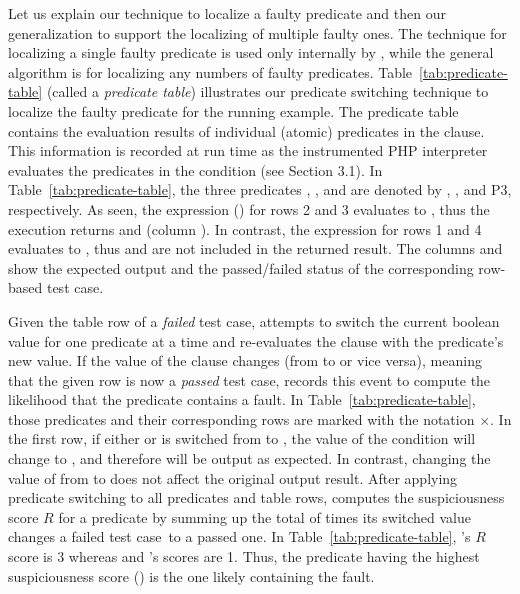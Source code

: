 Let us explain our technique to localize a faulty predicate and
then our generalization to support the localizing of multiple faulty
ones.  The technique for localizing a single faulty predicate is used
only internally by {\tool}, while the general algorithm is for localizing
any numbers of faulty predicates. Table~\ref{tab:predicate-table}
(called a \emph{predicate table}) illustrates our predicate switching
technique to localize the faulty predicate for the running example.
The predicate table contains the evaluation results of individual
(atomic) predicates in the  clause. This information is
recorded at run time as the instrumented PHP interpreter evaluates the
predicates in the
 condition (see Section 3.1). In
Table~\ref{tab:predicate-table}, the three predicates , , and  are denoted
by , , and {P3}, respectively. As seen, the
 expression () for rows 2 and 3
evaluates to , thus the execution returns
 and  (column ). In contrast,
the  expression for rows 1 and 4 evaluates to
, thus  and  are not included in
the returned result. The columns  and
 show the expected output and the passed/failed
status of the corresponding row-based test case.


Given the table row of a \emph{failed} test case, \tool{} attempts to
switch the current boolean value for one predicate at a time and
re-evaluates the  clause with the predicate's new
value. If the value of the  clause changes (from
 to  or vice versa), meaning that the given row
is now a \emph{passed} test case, \tool{} records this event to
compute the likelihood that the predicate contains a fault. In
Table~\ref{tab:predicate-table}, those predicates and their
corresponding rows are marked with the notation $\times$. In the first
row, if either  or  is switched from  to
, the value of the
 condition  will change to
, and therefore  will be output as expected. 
In contrast, changing the value of  from  to
 does not affect the original output result. After
applying predicate switching to all predicates and table rows,
\tool{} computes the suspiciousness score $R$ for a predicate by
summing up the total of times its switched value changes a failed test
case~to a passed one. In Table~\ref{tab:predicate-table}, 's
$R$ score is 3 whereas  and 's scores are 1.
Thus, the predicate having the highest suspiciousness score
() is the one likely containing the fault.

